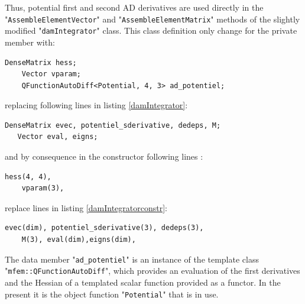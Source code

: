 \documentclass[12pt]{article}
\newcommand{\mycode}[1]{\textsf{"}\lstinline`#1`\textsf{"}}
\begin{document}
Thus, potential first and second AD derivatives are used directly in the \mycode{AssembleElementVector} and \mycode{AssembleElementMatrix} methods of the slightly modified \mycode{damIntegrator} class.
This class definition  only change  for the private member with: 
\begin{lstlisting}[numbers=none,basicstyle=\scriptsize]
    DenseMatrix hess;
    Vector vparam;
    QFunctionAutoDiff<Potential, 4, 3> ad_potentiel;
\end{lstlisting}
replacing following lines in listing \ref{damIntegrator}:
\begin{lstlisting}[firstnumber=17,basicstyle=\scriptsize]
   DenseMatrix evec, potentiel_sderivative, dedeps, M;
   Vector eval, eigns;
\end{lstlisting}
and by consequence in the constructor following lines :
\begin{lstlisting}[numbers=none,basicstyle=\scriptsize]
    hess(4, 4),
    vparam(3),
\end{lstlisting} replace lines in listing \ref{damIntegratorconstr}:
\begin{lstlisting}[firstnumber=7,basicstyle=\scriptsize]
	evec(dim), potentiel_sderivative(3), dedeps(3),
    M(3), eval(dim),eigns(dim),
\end{lstlisting}
The data member \mycode{ad_potentiel} is an instance of the template class \mycode{mfem::QFunctionAutoDiff}, which provides an evaluation of the first derivatives and the Hessian of a templated scalar function provided as a functor. In the present it is the object function \mycode{Potential} that is in use.
\end{document}

